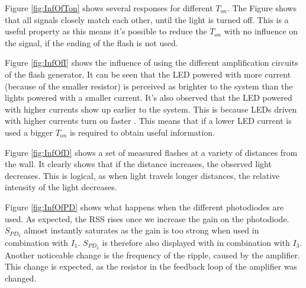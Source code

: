 Figure \ref{fig:InfOfTon} shows several responses for different $T_{on}$. The Figure shows that all signals closely match each other, until the light is turned off. This is a useful property as this means it's possible to reduce the $T_{on}$ with no influence on the signal, if the ending of the flash is not used.

Figure \ref{fig:InfOfI} shows the influence of using the different amplification circuits of the flash generator. It can be seen that the LED powered with more current (because of the smaller resistor) is perceived as brighter to the system than the lights powered with a smaller current. It's also observed that the LED powered with higher currents show up earlier to the system. This is because LEDs driven with higher currents turn on faster \cite{LED_on}. This means that if a lower LED current is used a bigger $T_{on}$ is required to obtain useful information.

Figure \ref{fig:InfOfD} shows a set of measured flashes at a variety of distances from the wall. It clearly shows that if the distance increases, the observed light decreases. This is logical, as when light travels longer distances, the relative intensity of the light decreases. 

Figure \ref{fig:InfOfPD} shows what happens when the different photodiodes are used. As expected, the RSS rises once we increase the gain on the photodiode. $S_{PD_3}$ almost instantly saturates as the gain is too strong when used in combination with $I_1$. $S_{PD_3}$ is therefore also displayed with in combination with $I_3$. Another noticeable change is the frequency of the ripple, caused by the amplifier. This change is expected, as the resistor in the feedback loop of the amplifier was changed.

